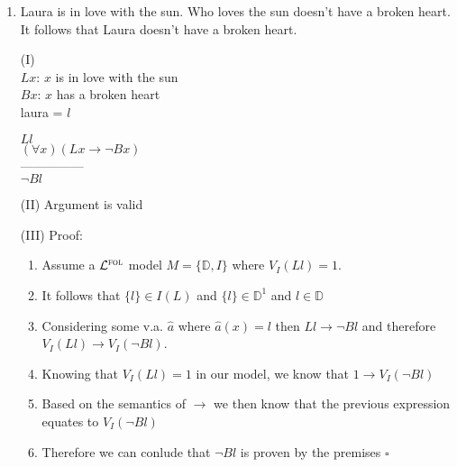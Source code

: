 \documentclass[12pt]{article}
\newcommand{\set}[1]{\lbrace#1\rbrace} %
\newcommand{\FOL}{\mathcal{L}^{\textsc{fol}}} %
\newcommand{\answer}[1]{%
  \par\noindent
  \begin{tcolorbox}[colback=gray!10, colframe=gray!80, title=Proof]
    #1
  \end{tcolorbox}
}
\begin{document}
\begin{enumerate}

  \item	Laura is in love with the sun. Who loves the sun doesn't have a broken heart. It follows that Laura doesn't have a broken heart.
    \answer{
      \begin{flushleft}
        (I) \\
        $Lx$: $x$ is in love with the sun \\
        $Bx$: $x$ has a broken heart \\
        laura = $l$ \\
        
        \bigskip
        
        $Ll$ \\
        $(\forall x)(Lx \rightarrow \lnot Bx)$ \\
        --------------- \\
        $\lnot Bl$
    \end{flushleft}
      (II) Argument is valid
      \bigskip
      
      (III) Proof:
      \begin{enumerate}[label=\arabic*.]
        \item Assume a $\FOL$ model $M=\set{\mathbb{D},I}$ where $V_I(Ll)=1$.
        \item It follows that $\set{l} \in I(L)$ and $\set{l} \in \mathbb{D}^1$ and $l \in \mathbb{D}$
        \item Considering some v.a. $\hat{a}$ where $\hat{a}(x)=l$
        then $Ll \rightarrow \lnot Bl$ and therefore
        $V_I(Ll) \rightarrow V_I(\lnot Bl)$.
        \item Knowing that $V_I(Ll)=1$ in our model, we know that $1 \rightarrow V_I(\lnot Bl)$
        \item Based on the semantics of $\rightarrow$ we then know that the previous expression
        equates to $V_I(\lnot Bl)$
        \item Therefore we can conlude that $\lnot Bl$ is proven by the premises $\square$
      \end{enumerate}
        
    
}
\end{enumerate}
\end{document}
